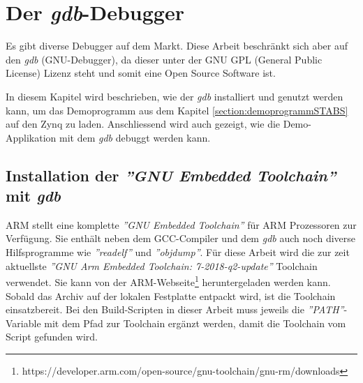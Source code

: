 \chapter{Der \textit{gdb}-Debugger}
\label{chapter:Der-gdb-Debugger}
Es gibt diverse Debugger auf dem Markt.
Diese Arbeit beschränkt sich aber auf den  \textit{gdb} (GNU-Debugger), da dieser unter der GNU GPL (General Public License) Lizenz steht und somit eine Open Source Software ist.

In diesem Kapitel wird beschrieben, wie der \textit{gdb} installiert und genutzt werden kann, um das Demoprogramm aus dem Kapitel \ref{section:demoprogrammSTABS} auf den Zynq zu laden.
Anschliessend wird auch gezeigt, wie die Demo-Applikation mit dem \textit{gdb} debuggt werden kann.


\section{Installation der \textit{''GNU Embedded Toolchain''} mit \textit{gdb}}
\label{section:installationGDB}
ARM stellt eine komplette \textit{''GNU Embedded Toolchain''} für ARM Prozessoren zur Verfügung.
Sie enthält neben dem GCC-Compiler und dem \textit{gdb} auch noch diverse Hilfsprogramme wie \textit{''readelf''} und \textit{''objdump''}.
Für diese Arbeit wird die zur zeit aktuellste \textit{''GNU Arm Embedded Toolchain: 7-2018-q2-update''} Toolchain verwendet.
Sie kann von der ARM-Webseite\footnote{https://developer.arm.com/open-source/gnu-toolchain/gnu-rm/downloads} heruntergeladen werden kann.
Sobald das Archiv auf der lokalen Festplatte entpackt wird, ist die Toolchain einsatzbereit.
Bei den Build-Scripten in dieser Arbeit muss jeweils die \textit{''PATH''}-Variable mit dem Pfad zur Toolchain ergänzt werden, damit die Toolchain vom Script gefunden wird.


